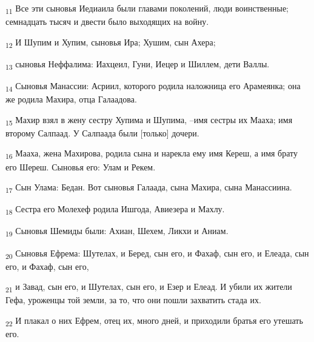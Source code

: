 \begin{tcolorbox}
\textsubscript{11} Все эти сыновья Иедиаила были главами поколений, люди воинственные; семнадцать тысяч и двести было выходящих на войну.
\end{tcolorbox}
\begin{tcolorbox}
\textsubscript{12} И Шупим и Хупим, сыновья Ира; Хушим, сын Ахера;
\end{tcolorbox}
\begin{tcolorbox}
\textsubscript{13} сыновья Неффалима: Иахцеил, Гуни, Иецер и Шиллем, дети Валлы.
\end{tcolorbox}
\begin{tcolorbox}
\textsubscript{14} Сыновья Манассии: Асриил, которого родила наложница его Арамеянка; она же родила Махира, отца Галаадова.
\end{tcolorbox}
\begin{tcolorbox}
\textsubscript{15} Махир взял в жену сестру Хупима и Шупима, --имя сестры их Мааха; имя второму Салпаад. У Салпаада были [только] дочери.
\end{tcolorbox}
\begin{tcolorbox}
\textsubscript{16} Мааха, жена Махирова, родила сына и нарекла ему имя Кереш, а имя брату его Шереш. Сыновья его: Улам и Рекем.
\end{tcolorbox}
\begin{tcolorbox}
\textsubscript{17} Сын Улама: Бедан. Вот сыновья Галаада, сына Махира, сына Манассиина.
\end{tcolorbox}
\begin{tcolorbox}
\textsubscript{18} Сестра его Молехеф родила Ишгода, Авиезера и Махлу.
\end{tcolorbox}
\begin{tcolorbox}
\textsubscript{19} Сыновья Шемиды были: Ахиан, Шехем, Ликхи и Аниам.
\end{tcolorbox}
\begin{tcolorbox}
\textsubscript{20} Сыновья Ефрема: Шутелах, и Беред, сын его, и Фахаф, сын его, и Елеада, сын его, и Фахаф, сын его,
\end{tcolorbox}
\begin{tcolorbox}
\textsubscript{21} и Завад, сын его, и Шутелах, сын его, и Езер и Елеад. И убили их жители Гефа, уроженцы той земли, за то, что они пошли захватить стада их.
\end{tcolorbox}
\begin{tcolorbox}
\textsubscript{22} И плакал о них Ефрем, отец их, много дней, и приходили братья его утешать его.
\end{tcolorbox}
